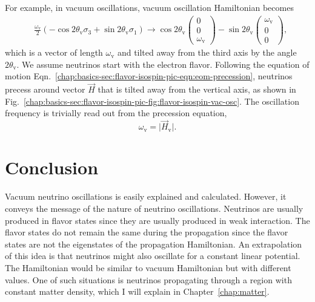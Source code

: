 For example, in vacuum oscillations, vacuum oscillation Hamiltonian becomes
\begin{align*}
&\frac{\omega_{\mathrm v} }{2}\left( - \cos 2\theta_{\mathrm v } \sigma_3  + \sin 2\theta_{\mathrm{v}} \sigma_1 \right)
\to  \cos 2\theta_{\mathrm v}\begin{pmatrix}
0\\
0\\
\omega_{\mathrm v}
\end{pmatrix} -\sin 2\theta_{\mathrm v}\begin{pmatrix}
\omega_{\mathrm v}\\
0\\
0
\end{pmatrix},
\end{align*}
which is a vector of length $\omega_{\mathrm v}$ and tilted away from the third axis by the angle $2\theta_{\mathrm v}$. We assume neutrinos start with the electron flavor. Following the equation of motion Eqn.~\ref{chap:basics-sec:flavor-isospin-pic-eqn:eom-precession}, neutrinos precess around vector $\vec H$ that is tilted away from the vertical axis, as shown in Fig.~\ref{chap:basics-sec:flavor-isospin-pic-fig:flavor-isospin-vac-osc}. The oscillation frequency is trivially read out from the precession equation,
\begin{equation*}
    \omega_{\mathrm v} = \lvert \vec H_{\mathrm v} \rvert.
\end{equation*}





\section{Conclusion}

Vacuum neutrino oscillations is easily explained and calculated. However, it conveys the message of the nature of neutrino oscillations. Neutrinos are usually produced in flavor states since they are usually produced in weak interaction. The flavor states do not remain the same during the propagation since the flavor states are not the eigenstates of the propagation Hamiltonian. An extrapolation of this idea is that neutrinos might also oscillate for a constant linear potential. The Hamiltonian would be similar to vacuum Hamiltonian but with different values. One of such situations is neutrinos propagating through a region with constant matter density, which I will explain in Chapter~\ref{chap:matter}.
